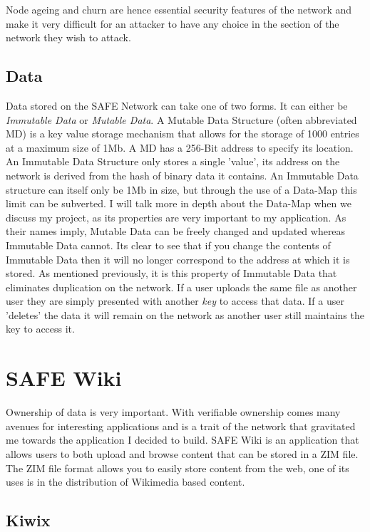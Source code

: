 \documentclass{l4proj}
\begin{document}
Node ageing and churn are hence essential security features of the network and make it very difficult for an attacker to have any choice in the section of the network they wish to attack.

\section{Data}

Data stored on the SAFE Network can take one of two forms. It can either be \textit{Immutable Data} or \textit{Mutable Data}. A Mutable Data Structure (often abbreviated MD) is a key value storage mechanism that allows for the storage of 1000 entries at a maximum size of 1Mb. A MD has a 256-Bit address to specify its location. An Immutable Data Structure only stores a single 'value', its address on the network is derived from the hash of binary data it contains. An Immutable Data structure can itself only be 1Mb in size, but through the use of a Data-Map this limit can be subverted. I will talk more in depth about the Data-Map when we discuss my project, as its properties are very important to my application. As their names imply, Mutable Data can be freely changed and updated whereas Immutable Data cannot. Its clear to see that if you change the contents of Immutable Data then it will no longer correspond to the address at which it is stored. As mentioned previously, it is this property of Immutable Data that eliminates duplication on the network. If a user uploads the same file as another user they are simply presented with another \textit{key} to access that data. If a user 'deletes' the data it will remain on the network as another user still maintains the key to access it.

\chapter{SAFE Wiki}

Ownership of data is very important. With verifiable ownership comes many avenues for interesting applications and is a trait of the network that gravitated me towards the application I decided to build. SAFE Wiki is an application that allows users to both upload and browse content that can be stored in a ZIM file. The ZIM file format allows you to easily store content from the web, one of its uses is in the distribution of Wikimedia based content.

\section{Kiwix}
\end{document}
